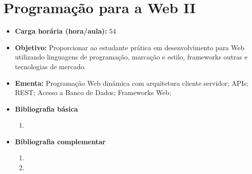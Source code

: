 \documentclass[11pt,fleqn]{book} %
\begin{document}


\newpage
\section{Programação para a Web II}\label{5_ppw2}
\begin{itemize}
	\item \textbf{Carga horária (hora/aula):} 54
	\item \textbf{Objetivo:} Proporcionar ao estudante prática em desenvolvimento para Web utilizando linguagens de programação, marcação e estilo, frameworks outras e tecnologias de mercado.
	\item \textbf{Ementa:} 
	Programação Web dinâmica com arquitetura cliente servidor;
	APIs;
	REST;
	Acesso a Banco de Dados;
	Frameworks Web;
	\item \textbf{Bibliografia básica}
	\begin{enumerate}
		\item 
	\end{enumerate}
	\item \textbf{Bibliografia complementar}
	\begin{enumerate}
		\item
		\item 
	\end{enumerate}
\end{itemize}


\newpage
\end{document}
